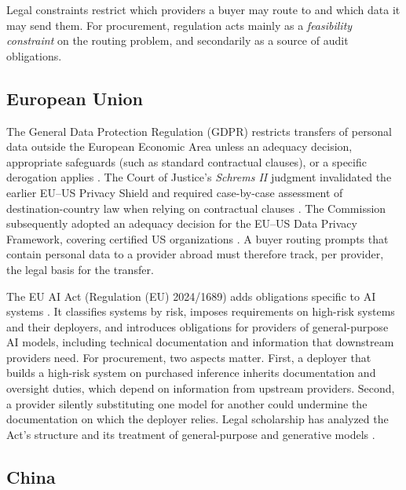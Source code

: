 Legal constraints restrict which providers a buyer may route to and which data it may send them. For procurement, regulation acts mainly as a \emph{feasibility constraint} on the routing problem, and secondarily as a source of audit obligations.

\subsection{European Union}\label{european-union}

The General Data Protection Regulation (GDPR) restricts transfers of personal data outside the European Economic Area unless an adequacy decision, appropriate safeguards (such as standard contractual clauses), or a specific derogation applies \cite{eu2016gdpr}. The Court of Justice's \emph{Schrems II} judgment invalidated the earlier EU--US Privacy Shield and required case-by-case assessment of destination-country law when relying on contractual clauses \cite{cjeu2020schrems}. The Commission subsequently adopted an adequacy decision for the EU--US Data Privacy Framework, covering certified US organizations \cite{eu2023dpf}. A buyer routing prompts that contain personal data to a provider abroad must therefore track, per provider, the legal basis for the transfer.

The EU AI Act (Regulation (EU) 2024/1689) adds obligations specific to AI systems \cite{eu2024aiact}. It classifies systems by risk, imposes requirements on high-risk systems and their deployers, and introduces obligations for providers of general-purpose AI models, including technical documentation and information that downstream providers need. For procurement, two aspects matter. First, a deployer that builds a high-risk system on purchased inference inherits documentation and oversight duties, which depend on information from upstream providers. Second, a provider silently substituting one model for another could undermine the documentation on which the deployer relies. Legal scholarship has analyzed the Act's structure and its treatment of general-purpose and generative models \cite{veale2021demystifying, hacker2023regulating}.

\subsection{China}\label{china}

